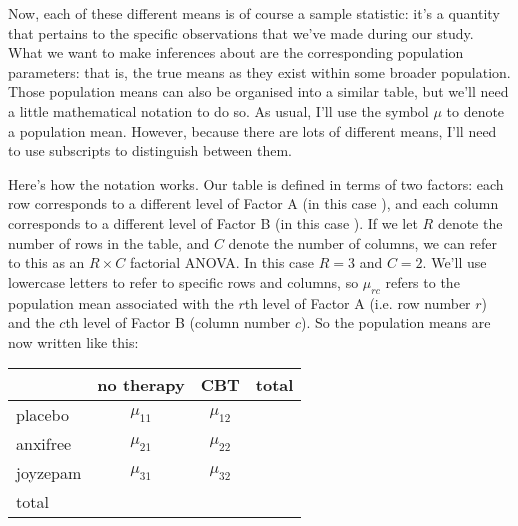 Now, each of these different means is of course a sample statistic: it's a quantity that pertains to the specific observations that we've made during our study. What we want to make inferences about are the corresponding population parameters: that is, the true means as they exist within some broader population. Those population means can also be organised into a similar table, but we'll need a little mathematical notation to do so. As usual, I'll use the symbol $\mu$ to denote a population mean. However, because there are lots of different means, I'll need to use subscripts to distinguish between them. 

Here's how the notation works. Our table is defined in terms of two factors: each row corresponds to a different level of Factor A (in this case ), and each column corresponds to a different level of Factor B (in this case ). If we let $R$ denote the number of rows in the table, and $C$ denote the number of columns, we can refer to this as an $R \times C$ factorial ANOVA. In this case $R=3$ and $C=2$. We'll use lowercase letters to refer to specific rows and columns, so $\mu_{rc}$ refers to the population mean associated with the $r$th level of Factor A (i.e. row number $r$) and the $c$th level of Factor B (column number $c$). So the population means are now written like this:
\begin{center}
\begin{tabular}{l|cc|c}
& no therapy & CBT & total \\ \hline
placebo & $\mu_{11}$ & $\mu_{12}$ &  \\
anxifree & $\mu_{21}$ & $\mu_{22}$ &  \\
joyzepam & $\mu_{31}$ &$\mu_{32}$ &  \\ \hline
total &  &  & 
\end{tabular}
\end{center}
